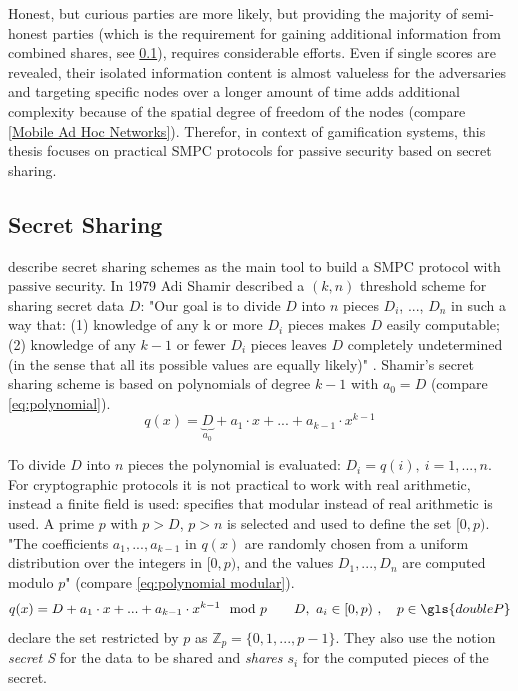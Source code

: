Honest, but curious parties are more likely, but providing the majority of semi-honest parties (which is the requirement for gaining additional information from combined shares, see \ref{Secret Sharing}), requires considerable efforts. Even if single scores are revealed, their isolated information content is almost valueless for the adversaries and targeting specific nodes over a longer amount of time adds additional complexity because of the spatial degree of freedom of the nodes (compare \ref{Mobile Ad Hoc Networks}).
Therefor, in context of gamification systems, this thesis focuses on practical \gls{SMPC} protocols for passive security based on secret sharing.

\subsection{Secret Sharing}	\label{Secret Sharing}

\textcite[p. 32]{Cramer2015} describe secret sharing schemes as the main tool to build a \gls{SMPC} protocol with passive security. In 1979 Adi Shamir described a $(k, n)$ threshold scheme for sharing secret data $D$: "Our goal is to divide $D$ into $n$ pieces $D_i$, ..., $D_n$ in such a way that:
(1) knowledge of any k or more $D_i$ pieces makes $D$ easily computable; (2) knowledge of any $k-1$ or fewer $D_i$ pieces leaves $D$ completely undetermined (in the sense that all its possible values are equally likely)" \autocite{Shamir1979}.
Shamir's secret sharing scheme is based on polynomials of degree $k-1$ with $a_0=D$ (compare \ref{eq:polynomial}). 
\begin{equation}
\label{eq:polynomial}
q(x)=\underbrace{D}_{a_0} + a_1 \cdot x + ... + a_{k-1} \cdot x^{k-1}
\end{equation}

To divide $D$ into $n$ pieces the polynomial is evaluated: $D_i=q(i),\ i=1,...,n$. For cryptographic protocols it is not practical to work with real arithmetic, instead a finite field is used: \textcite{Shamir1979} specifies that modular instead of real arithmetic is used. A prime $p$ with $p>D$, $p>n$ is selected and used to define the set $[0, p)$. "The coefficients $a_1, ..., a_{k-1}$ in $q(x)$ are randomly chosen	from a uniform distribution over the integers in $[0, p)$, and the values $D_1, ..., D_n$ are computed modulo $p$" \autocite[p. 613]{Shamir1979} (compare \ref{eq:polynomial modular}).
\begin{equation}
\label{eq:polynomial modular}
q(x) = D + a_1 \cdot x + ... + a_{k-1} \cdot x^{k-1} \mod p \qquad D,\ a_i \in [0,p)\ , \quad p \in \gls{doubleP}
\end{equation}
\textcite[p. 7]{Cramer2015} declare the set restricted by $p$ as $\mathbb{Z}_p = \{0, 1, ..., p-1\}$. They also use the notion \textit{secret S} for the data to be shared and \textit{shares $s_i$} for the computed pieces of the secret.

